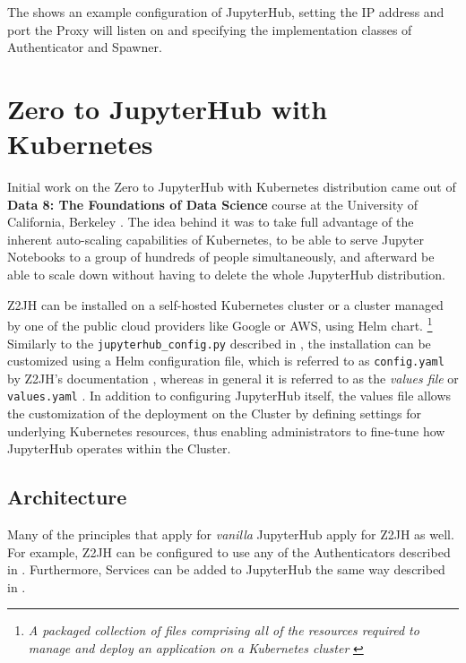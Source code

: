 \documentclass[
  digital,     %
  oneside,     %
  nosansbold,  %
  nocolorbold, %
  lof,         %
  nolot,         %
]{fithesis4}
\begin{document}
The  shows an example configuration of JupyterHub, setting the IP address and port the Proxy will listen on and specifying the implementation classes of Authenticator and Spawner.

\section{Zero to JupyterHub with Kubernetes}
\label{sec:z2jh}

Initial work on the Zero to JupyterHub with Kubernetes distribution came out of \textbf{Data 8: The Foundations of Data Science
} course at the University of California, Berkeley \cite{z2jh_uc_berkeley}. The idea behind it was to take full advantage of the inherent auto-scaling capabilities of Kubernetes, to be able to serve Jupyter Notebooks to a group of hundreds of people simultaneously, and afterward be able to scale down without having to delete the whole JupyterHub distribution.

Z2JH can be installed on a self-hosted Kubernetes cluster or a cluster managed by one of the public cloud providers like Google or AWS, using Helm chart.
\footnote{\emph{A packaged collection of files comprising all of the resources required to manage and deploy an application on a Kubernetes cluster} \cite{helm_charts}} Similarly to the \texttt{jupyterhub\_config.py} described in , the installation can be customized using a Helm configuration file, which is referred to as \texttt{config.yaml} by Z2JH's documentation \cite{jupyterhub_z2jh_config}, whereas in general it is referred to as the \emph{values file} or \texttt{values.yaml} \cite{helm_charts}. In addition to configuring JupyterHub itself, the values file allows the customization of the deployment on the Cluster by defining settings for underlying Kubernetes resources, thus enabling administrators to fine-tune how JupyterHub operates within the Cluster.

\subsection{Architecture}
Many of the principles that apply for \emph{vanilla} JupyterHub apply for Z2JH as well. For example, Z2JH can be configured to use any of the Authenticators described in . Furthermore, Services can be added to JupyterHub the same way described in .
\end{document}
